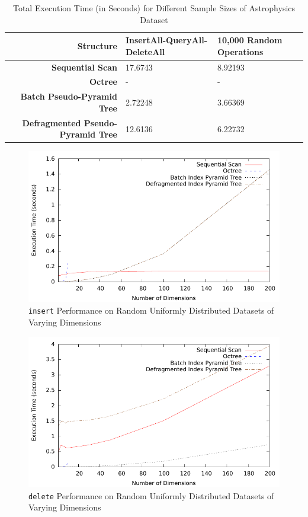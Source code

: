 \begin{landscape}
	\begin{table}
		\centering
		\begin{tabular}{|r|l|l|}
			\hline
			\textbf{Structure} & \textbf{InsertAll-QueryAll-DeleteAll} & \textbf{10,000 Random Operations} \\
			\hline
			\textbf{Sequential Scan} & 17.6743 & 8.92193 \\
			\textbf{Octree} & - & - \\
			\textbf{Batch Pseudo-Pyramid Tree} & 2.72248 & 3.66369 \\
			\textbf{Defragmented Pseudo-Pyramid Tree} & 12.6136 & 6.22732 \\
			\hline
		\end{tabular}
		\caption{Total Execution Time (in Seconds) for Different Sample Sizes of Astrophysics Dataset}
		\label{tab:perf1-astrophysics}
	\end{table}	

\end{landscape}

\begin{figure}
	\centering
	\includegraphics[scale=0.8]{figures/performance_analysis/iteration_1/all_insert_randuniform.pdf}
	\caption{\texttt{insert} Performance on Random Uniformly Distributed Datasets of Varying Dimensions}
	\label{fig:perf1-allinsert-d}
\end{figure}

\begin{figure}
	\centering
	\includegraphics[scale=0.8]{figures/performance_analysis/iteration_1/all_delete_randuniform.pdf}
	\caption{\texttt{delete} Performance on Random Uniformly Distributed Datasets of Varying Dimensions}
	\label{fig:perf1-alldelete-d}
\end{figure}

